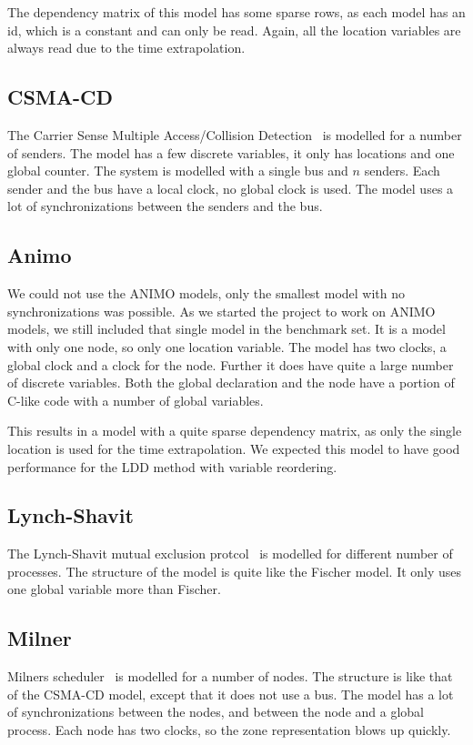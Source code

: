 The dependency matrix of this model has some sparse rows, as each model has an id, which is a constant and can only be read. Again, all the location variables are always read due to the time extrapolation. 

\subsection{CSMA-CD}
The Carrier Sense Multiple Access/Collision Detection~\cite{kronos} is modelled for a number of senders. The model has a few discrete variables, it only has locations and one global counter. The system is modelled with a single bus and $n$ senders. Each sender and the bus have a local clock, no global clock is used. The model uses a lot of synchronizations between the senders and the bus.

\subsection{Animo}
We could not use the ANIMO models, only the smallest model with no synchronizations was possible. As we started the project to work on ANIMO models, we still included that single model in the benchmark set. It is a model with only one node, so only one location variable. The model has two clocks, a global clock and a clock for the node.  Further it does have quite a large number of discrete variables. Both the global declaration and the node have a portion of C-like code with a number of global variables. 

This results in a model with a quite sparse dependency matrix, as only the single location is used for the time extrapolation. We expected this model to have good performance for the LDD method with variable reordering.

\subsection{Lynch-Shavit}
The Lynch-Shavit mutual exclusion protcol~\cite{LS} is modelled for different number of processes. The structure of the model is quite like the Fischer model. It only uses one global variable more than Fischer.

\subsection{Milner}
Milners scheduler~\cite{Milner:1989:CC:534666} is modelled for a number of nodes. The structure is like that of the CSMA-CD model, except that it does not use a bus. The model has a lot of synchronizations between the nodes, and between the node and a global process. Each node has two clocks, so the zone representation blows up quickly. 

